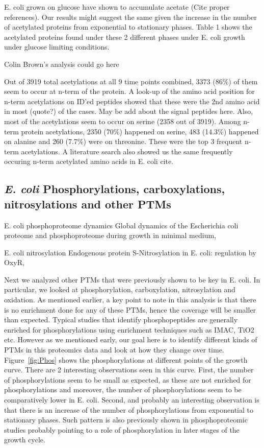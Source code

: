 \documentclass[12pt]{article}
\begin{document}
E. coli grown on glucose have shown to accumulate acetate (Cite proper references). Our results might suggest the same given the increase in the number of acetylated proteins from exponential to stationary phases. Table 1 shows the acetylated proteins found under these 2 different phases under E. coli growth under glucose limiting conditions.

{Colin Brown's analysis could go here}


Out of 3919 total acetylations at all 9 time points combined, 3373 (86\%) of them seem to occur at n-term of the protein. A look-up of the amino acid position for n-term acetylations on ID'ed peptides showed that these were the 2nd amino acid in most (quote?) of the cases. {May be add about the signal peptides here}. Also, most of the acetylations seem to occur on serine (2358 out of 3919). Among n-term protein acetylations, 2350 (70\%) happened on serine, 483 (14.3\%) happened on alanine and 260 (7.7\%) were on threonine. These were the top 3 frequent n-term acetylations. A literature search also showed us the same frequently occuring n-term acetylated amino acids in E. coli {cite}.


\subsection{\emph{E. coli} Phosphorylations, carboxylations, nitrosylations and other PTMs}

E. coli phosphoproteome dynamics \cite{Soaresetal2013}
{Global dynamics of the Escherichia coli proteome and phosphoproteome during growth in minimal medium},

E. coli nitrosylation \cite{Sethetal2012}
{Endogenous protein S-Nitrosylation in E. coli: regulation by OxyR},

Next we analyzed other PTMs that were previously shown to be key in E. coli. In particular, we looked at phosphorylation, carboxylation, nitrosylation and oxidation. As mentioned earlier, a key point to note in this analysis is that there is no enrichment done for any of these PTMs, hence the coverage will be smaller than expected. Typical studies that identify phosphopeptides are generally enriched for phosphorylations using enrichment techniques such as IMAC, TiO2 etc. However as we mentioned early, our goal here is to identify different kinds of PTMs in this proteomics data and look at how they change over time. Figure~\ref{fig:Phos} shows the phosphorylations at different points of the growth curve. There are 2 interesting observations seen in this curve. First, the number of phosphorylations seem to be small as expected, as these are not enriched for phosphorylations and moreover, the number of phosphorylations seem to be comparatively lower in E. coli. Second, and probably an interesting observation is that there is an increase of the number of phosphorylations from exponential to stationary phases. Such pattern is also previously shown in phosphoproteomic studies \cite{Soaresetal2013} probably pointing to a role of phosphorylation in later stages of the growth cycle.
\end{document}
